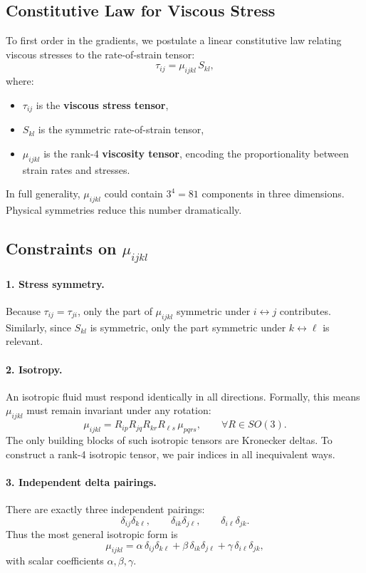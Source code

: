 \subsection{Constitutive Law for Viscous Stress}
To first order in the gradients, we postulate a linear constitutive law relating viscous stresses to the rate-of-strain tensor:
\[
\tau_{ij} = \mu_{ijkl} \, S_{kl},
\]
where:
\begin{itemize}
    \item $\tau_{ij}$ is the \textbf{viscous stress tensor},
    \item $S_{kl}$ is the symmetric rate-of-strain tensor,
    \item $\mu_{ijkl}$ is the rank-4 \textbf{viscosity tensor}, encoding the proportionality between strain rates and stresses.
\end{itemize}

In full generality, $\mu_{ijkl}$ could contain $3^4=81$ components in three dimensions. Physical symmetries reduce this number dramatically.

\vspace{0.5cm}

\subsection{Constraints on $\mu_{ijkl}$}

\paragraph{1. Stress symmetry.}
Because $\tau_{ij} = \tau_{ji}$, only the part of $\mu_{ijkl}$ symmetric under $i \leftrightarrow j$ contributes. Similarly, since $S_{kl}$ is symmetric, only the part symmetric under $k \leftrightarrow \ell$ is relevant.

\paragraph{2. Isotropy.}
An isotropic fluid must respond identically in all directions. Formally, this means $\mu_{ijkl}$ must remain invariant under any rotation:
\[
\mu_{ijkl} = R_{ip}R_{jq}R_{kr}R_{\ell s}\,\mu_{pqrs}, \qquad \forall R \in SO(3).
\]
The only building blocks of such isotropic tensors are Kronecker deltas. To construct a rank-4 isotropic tensor, we pair indices in all inequivalent ways.

\paragraph{3. Independent delta pairings.}
There are exactly three independent pairings:
\[
\delta_{ij}\delta_{k\ell}, \qquad
\delta_{ik}\delta_{j\ell}, \qquad
\delta_{i\ell}\delta_{jk}.
\]
Thus the most general isotropic form is
\[
\mu_{ijkl} = \alpha \,\delta_{ij}\delta_{k\ell}
+ \beta \,\delta_{ik}\delta_{j\ell}
+ \gamma \,\delta_{i\ell}\delta_{jk},
\]
with scalar coefficients $\alpha,\beta,\gamma$.

